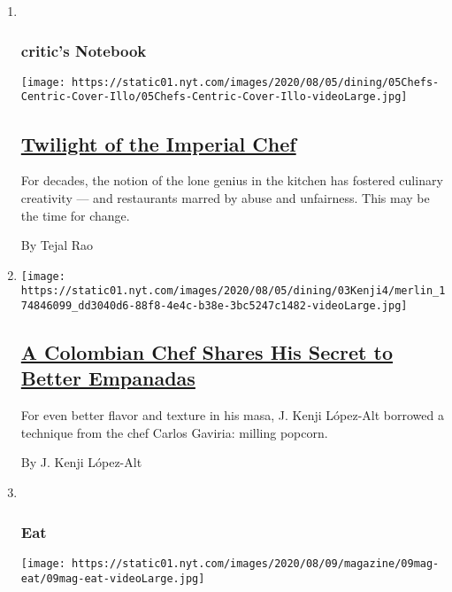 \begin{enumerate}
\def\labelenumi{\arabic{enumi}.}
\item ~
  \hypertarget{critics-notebook}{%
  \subsubsection{critic's Notebook}\label{critics-notebook}}

  \texttt{[image: https://static01.nyt.com/images/2020/08/05/dining/05Chefs-Centric-Cover-Illo/05Chefs-Centric-Cover-Illo-videoLarge.jpg]}

  \hypertarget{twilight-of-the-imperial-chef}{%
  \subsection{\texorpdfstring{\href{/2020/08/04/dining/chef-restaurant-culture.html}{Twilight
  of the Imperial
  Chef}}{Twilight of the Imperial Chef}}\label{twilight-of-the-imperial-chef}}

  For decades, the notion of the lone genius in the kitchen has fostered
  culinary creativity --- and restaurants marred by abuse and
  unfairness. This may be the time for change.

  By Tejal Rao
\item
  \texttt{[image: https://static01.nyt.com/images/2020/08/05/dining/03Kenji4/merlin\_174846099\_dd3040d6-88f8-4e4c-b38e-3bc5247c1482-videoLarge.jpg]}

  \hypertarget{a-colombian-chef-shares-his-secret-to-better-empanadas}{%
  \subsection{\texorpdfstring{\href{/2020/08/04/dining/colombian-empanadas-carlos-gaviria.html}{A
  Colombian Chef Shares His Secret to Better
  Empanadas}}{A Colombian Chef Shares His Secret to Better Empanadas}}\label{a-colombian-chef-shares-his-secret-to-better-empanadas}}

  For even better flavor and texture in his masa, J. Kenji López-Alt
  borrowed a technique from the chef Carlos Gaviria: milling popcorn.

  By J. Kenji López-Alt
\item ~
  \hypertarget{eat}{%
  \subsubsection{Eat}\label{eat}}

  \texttt{[image: https://static01.nyt.com/images/2020/08/09/magazine/09mag-eat/09mag-eat-videoLarge.jpg]}


\end{enumerate}
